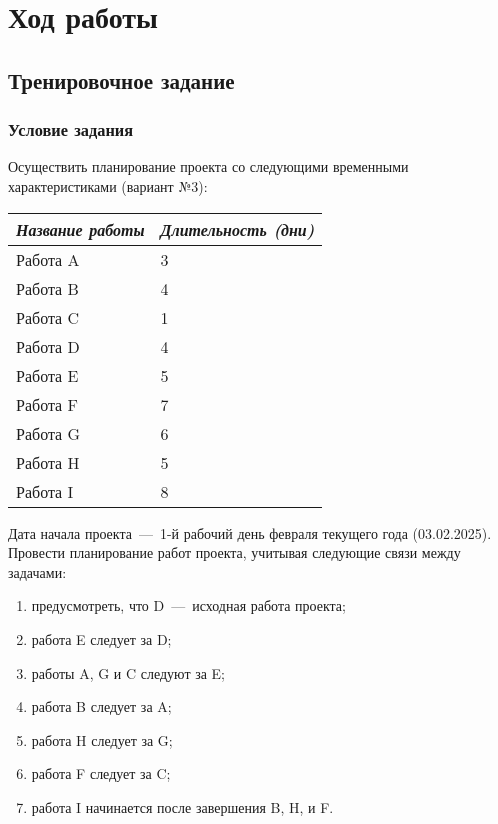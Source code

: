 \chapter{Ход работы}

\section{Тренировочное задание}

\subsection{Условие задания}

Осуществить планирование проекта со следующими временными характеристиками (вариант №3):
\begin{table}[h]
	\centering
	\begin{tabularx}{\textwidth}{|X|X|}
		\hline
		\textit{Название работы} & \textit{Длительность (дни)} \\ \hline
		Работа A        & 3                 \\ \hline
		Работа B        & 4                  \\ \hline
		Работа C        & 1                 \\ \hline
		Работа D        & 4                  \\ \hline
		Работа E        & 5                  \\ \hline
		Работа F        & 7                  \\ \hline
		Работа G        & 6                 \\ \hline
		Работа H        & 5                 \\ \hline
		Работа I        & 8                  \\ \hline
	\end{tabularx}
\end{table}

Дата начала проекта~---~1-й рабочий день февраля текущего года (03.02.2025). 
Провести планирование работ проекта, учитывая следующие связи между задачами:
\begin{enumerate}
	\item предусмотреть, что D~---~исходная работа проекта;
	\item работа E следует за D;
	\item работы A, G и C следуют за E;
	\item работа B следует за A;
	\item работа H следует за G;
	\item работа F следует за C;
	\item работа I начинается после завершения B, H, и F.
 \end{enumerate}

